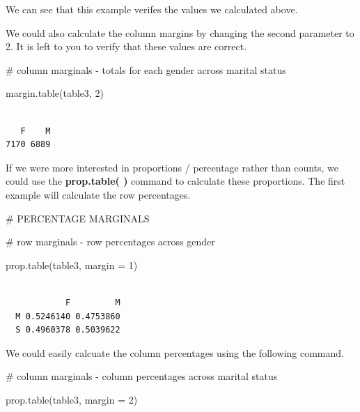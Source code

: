 \documentclass[
  letterpaper,
  DIV=11,
  numbers=noendperiod]{scrreprt}
\newenvironment{Shaded}{\begin{snugshade}}{\end{snugshade}}
\newcommand{\AttributeTok}[1]{\textcolor[rgb]{0.40,0.45,0.13}{#1}}
\newcommand{\CommentTok}[1]{\textcolor[rgb]{0.37,0.37,0.37}{#1}}
\newcommand{\DecValTok}[1]{\textcolor[rgb]{0.68,0.00,0.00}{#1}}
\newcommand{\FunctionTok}[1]{\textcolor[rgb]{0.28,0.35,0.67}{#1}}
\newcommand{\NormalTok}[1]{\textcolor[rgb]{0.00,0.23,0.31}{#1}}
\begin{document}
We can see that this example verifes the values we calculated above.

We could also calculate the column margins by changing the second
parameter to 2. It is left to you to verify that these values are
correct.

\begin{Shaded}
\begin{Highlighting}[]
\CommentTok{\# column marginals {-} totals for each gender across marital status}

\FunctionTok{margin.table}\NormalTok{(table3, }\DecValTok{2}\NormalTok{)}
\end{Highlighting}
\end{Shaded}

\begin{verbatim}

   F    M 
7170 6889 
\end{verbatim}

If we were more interested in proportions / percentage rather than
counts, we could use the \textbf{prop.table( )} command to calculate
these proportions. The first example will calculate the row percentages.

\begin{Shaded}
\begin{Highlighting}[]
\CommentTok{\# PERCENTAGE MARGINALS}

\CommentTok{\# row marginals {-} row percentages across gender}

\FunctionTok{prop.table}\NormalTok{(table3, }\AttributeTok{margin =} \DecValTok{1}\NormalTok{)}
\end{Highlighting}
\end{Shaded}

\begin{verbatim}
   
            F         M
  M 0.5246140 0.4753860
  S 0.4960378 0.5039622
\end{verbatim}

We could easily calcuate the column percentages using the following
command.

\begin{Shaded}
\begin{Highlighting}[]
\CommentTok{\# column marginals {-} column percentages across marital status}

\FunctionTok{prop.table}\NormalTok{(table3, }\AttributeTok{margin =} \DecValTok{2}\NormalTok{)}
\end{Highlighting}
\end{Shaded}
\end{document}
